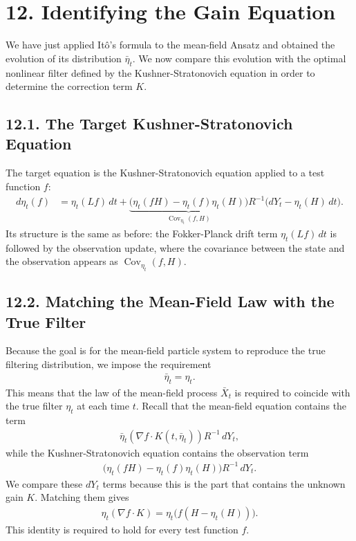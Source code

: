 \documentclass[11pt]{article}
\theoremstyle{definition}
\theoremstyle{remark}
\begin{document}
\section*{12. Identifying the Gain Equation}
We have just applied It\^o's formula to the mean-field Ansatz and obtained the evolution of its distribution $\bar\eta_t$. We now compare this evolution with the optimal nonlinear filter defined by the Kushner-Stratonovich equation in order to determine the correction term $K$.

\subsection*{12.1. The Target Kushner-Stratonovich Equation}
The target equation is the Kushner-Stratonovich equation applied to a test function $f$:
\begin{align*}
d\eta_t(f)
&=\eta_t(Lf)\,dt+\underbrace{\bigl(\eta_t(fH)-\eta_t(f)\eta_t(H)\bigr)}_{\operatorname{Cov}_{\eta_t}(f,H)}R^{-1}\bigl(dY_t-\eta_t(H)\,dt\bigr).
\end{align*}
Its structure is the same as before: the Fokker-Planck drift term $\eta_t(Lf)\,dt$ is followed by the observation update, where the covariance between the state and the observation appears as $\operatorname{Cov}_{\eta_t}(f,H)$.

\subsection*{12.2. Matching the Mean-Field Law with the True Filter}
Because the goal is for the mean-field particle system to reproduce the true filtering distribution, we impose the requirement
\begin{align*}
\bar\eta_t=\eta_t.
\end{align*}
This means that the law of the mean-field process $\bar X_t$ is required to coincide with the true filter $\eta_t$ at each time $t$.
Recall that the mean-field equation contains the term
\begin{align*}
\bar\eta_t(\nabla f\cdot K(t,\bar\eta_t))R^{-1}\,dY_t,
\end{align*}
while the Kushner-Stratonovich equation contains the observation term
\begin{align*}
\bigl(\eta_t(fH)-\eta_t(f)\eta_t(H)\bigr)R^{-1}\,dY_t.
\end{align*}
We compare these $dY_t$ terms because this is the part that contains the unknown gain $K$. Matching them gives
\begin{align*}
\eta_t(\nabla f\cdot K)=\eta_t\bigl(f(H-\eta_t(H))\bigr).
\end{align*}
This identity is required to hold for every test function $f$.
\end{document}

